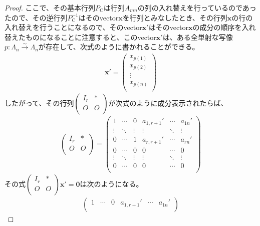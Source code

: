 \documentclass[dvipdfmx]{jsarticle}
\begin{document}
\begin{proof}
ここで、その基本行列$P_{\mathrm{C}}$は行列$A_{mn}$の列の入れ替えを行っているのであったので、その逆行列$P_{\mathrm{C}}^{- 1}$はそのvector$\mathbf{x}$を行列とみなしたとき、その行列$\mathbf{x}$の行の入れ替えを行うことになるので、そのvector$\mathbf{x}'$はそのvector$\mathbf{x}$の成分の順序を入れ替えたものになることに注意すると、このvector$\mathbf{x}'$は、ある全単射な写像$p:\varLambda_{n}\overset{\sim}{\rightarrow}\varLambda_{n}$が存在して、次式のように書かれることができる。
\begin{align*}
\mathbf{x}' = \begin{pmatrix}
x_{p(1)} \\
x_{p(2)} \\
 \vdots \\
x_{p(n)} \\
\end{pmatrix}
\end{align*}
したがって、その行列$\begin{pmatrix}
I_{r} & * \\
O & O \\
\end{pmatrix}$が次式のように成分表示されたらば、
\begin{align*}
\begin{pmatrix}
I_{r} & * \\
O & O \\
\end{pmatrix} = \begin{pmatrix}
1 & \cdots & 0 & a_{1,r + 1}' & \cdots & a_{1n}' \\
 \vdots & \ddots & \vdots & \vdots & \ddots & \vdots \\
0 & \cdots & 1 & a_{r,r + 1}' & \cdots & a_{rn}' \\
0 & \cdots & 0 & 0 & \cdots & 0 \\
 \vdots & \ddots & \vdots & \vdots & \ddots & \vdots \\
0 & \cdots & 0 & 0 & \cdots & 0 \\
\end{pmatrix}
\end{align*}
その式$\begin{pmatrix}
I_{r} & * \\
O & O \\
\end{pmatrix}\mathbf{x}' = \mathbf{0}$は次のようになる。
\begin{align*}
\begin{pmatrix}
1 & \cdots & 0 & a_{1,r + 1}' & \cdots & a_{1n}' \\

\end{pmatrix}
\end{align*}
\end{proof}
\end{document}
